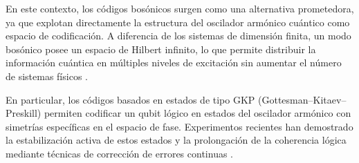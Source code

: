 En este contexto, los códigos bosónicos surgen como una alternativa prometedora, ya que explotan directamente la estructura del oscilador armónico cuántico como espacio de codificación. A diferencia de los sistemas de dimensión finita, un modo bosónico posee un espacio de Hilbert infinito, lo que permite distribuir la información cuántica en múltiples niveles de excitación sin aumentar el número de sistemas físicos \citep{cai2021bosonic}.

En particular, los códigos basados en estados de tipo GKP (Gottesman–Kitaev–Preskill) permiten codificar un qubit lógico en estados del oscilador armónico con simetrías específicas en el espacio de fase. Experimentos recientes han demostrado la estabilización activa de estos estados y la prolongación de la coherencia lógica mediante técnicas de corrección de errores continuas \citep{campagne2020quantum}.

